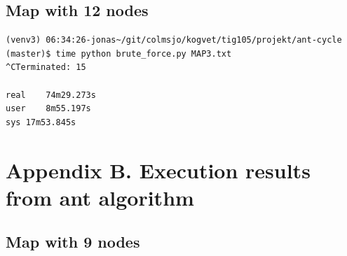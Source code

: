 \documentclass[11pt]{article}
\begin{document}
\subsection{Map with 12 nodes}

\begin{lstlisting}
(venv3) 06:34:26-jonas~/git/colmsjo/kogvet/tig105/projekt/ant-cycle (master)$ time python brute_force.py MAP3.txt
^CTerminated: 15

real	74m29.273s
user	8m55.197s
sys	17m53.845s
\end{lstlisting}


\clearpage
\section{Appendix B. Execution results from ant algorithm}

\subsection{Map with 9 nodes}
\end{document}
